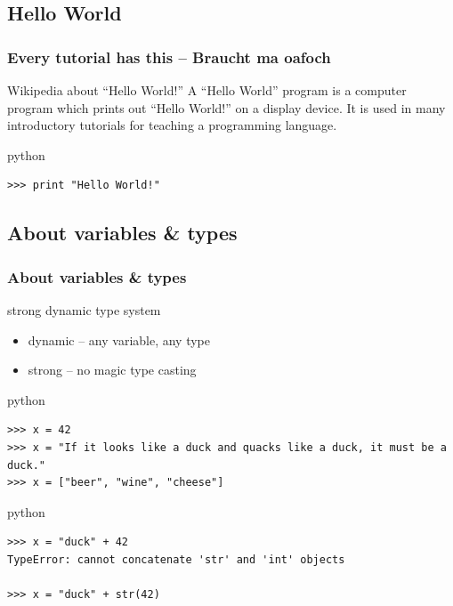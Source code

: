 \documentclass{beamer}
\begin{document}
\subsection{Hello World}
\begin{frame}[fragile]
    \frametitle{Every tutorial has this -- Braucht ma oafoch}
    \begin{block}{Wikipedia about ``Hello World!''}
    A ``Hello World'' program is a computer program which prints out ``Hello World!'' on a display device. It is used in many introductory tutorials for teaching a programming language.
    \end{block}
\pause
    \begin{exampleblock}{python}
    \begin{lstlisting}
>>> print "Hello World!" 
    \end{lstlisting}
    \end{exampleblock}
\end{frame}

\subsection{About variables \& types}
\begin{frame}[fragile]
	\frametitle{About variables \& types}
	\begin{alertblock}{strong dynamic type system}
	\begin{itemize}
	\item dynamic -- any variable, any type
	\item strong -- no magic type casting
	\end{itemize}
	\end{alertblock}
\pause
	\begin{exampleblock}{python}
	\begin{lstlisting}
>>> x = 42
>>> x = "If it looks like a duck and quacks like a duck, it must be a duck."
>>> x = ["beer", "wine", "cheese"]
	\end{lstlisting}
	\end{exampleblock}

\pause

	\begin{exampleblock}{python}
	\begin{lstlisting}
>>> x = "duck" + 42
TypeError: cannot concatenate 'str' and 'int' objects

>>> x = "duck" + str(42)
	\end{lstlisting}
	\end{exampleblock}
\end{frame}
\end{document}
